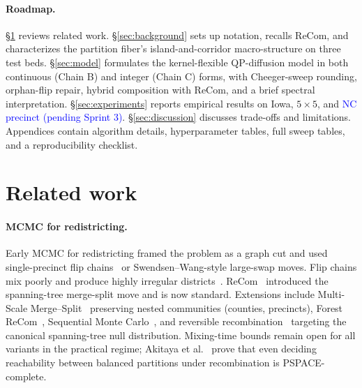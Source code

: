 \documentclass[11pt]{article}
\newcommand{\draft}[1]{\textcolor{blue}{#1}}
\begin{document}
\paragraph{Roadmap.}\label{sec:intro-roadmap}
\S\ref{sec:related} reviews related work. \S\ref{sec:background} sets
up notation, recalls ReCom, and characterizes the partition fiber's
island-and-corridor macro-structure on three test beds.
\S\ref{sec:model} formulates the kernel-flexible QP-diffusion model in
both continuous (Chain B) and integer (Chain C) forms, with
Cheeger-sweep rounding, orphan-flip repair, hybrid composition with
ReCom, and a brief spectral interpretation.
\S\ref{sec:experiments} reports empirical results on Iowa, $5 \times 5$,
and \draft{NC precinct (pending Sprint 3)}. \S\ref{sec:discussion}
discusses trade-offs and limitations. Appendices contain algorithm
details, hyperparameter tables, full sweep tables, and a
reproducibility checklist.

\section{Related work}\label{sec:related}

\paragraph{MCMC for redistricting.}\label{sec:related-mcmc}

Early MCMC for redistricting framed the problem as a graph cut and used
single-precinct flip chains~\cite{fifield2020automated} or
Swendsen--Wang-style large-swap moves. Flip chains mix poorly and
produce highly irregular districts~\cite{deford2021recombination,
najt2024empirical}. ReCom~\cite{deford2021recombination} introduced
the spanning-tree merge-split move and is now standard. Extensions
include Multi-Scale Merge--Split~\cite{autry2020multiscale} preserving
nested communities (counties, precincts), Forest ReCom~\cite{autry2023metropolized},
Sequential Monte Carlo~\cite{mccartan2023sequential}, and reversible
recombination~\cite{cannon2022spanning} targeting the canonical
spanning-tree null distribution. Mixing-time bounds remain open for
all variants in the practical regime; Akitaya et
al.~\cite{akitaya2022reconfiguration} prove that even deciding
reachability between balanced partitions under recombination is
PSPACE-complete.
\end{document}
